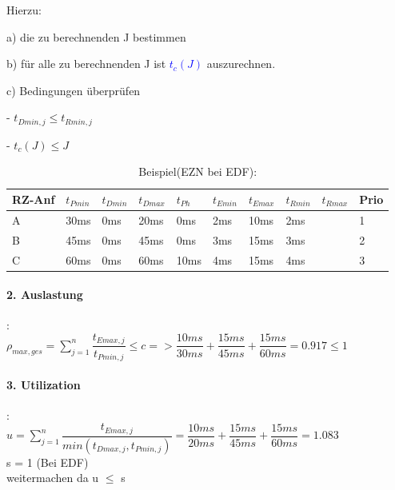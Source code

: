 \documentclass[12pt,a4paper,oneside,ngerman]{article}
\begin{document}
Hierzu: 
\begin{description}
	\item a) die zu berechnenden J bestimmen
	\item b) für alle zu berechnenden J ist \textcolor{blue}{\(t_{c}(J)\)} auszurechnen.
	\item c) Bedingungen überprüfen
	\begin{description}
		\item - \( t_{Dmin,j} \leq t_{Rmin,j} \)
		\item - \( t_{c}(J) \leq J \)
	\end{description}
\end{description}

\begin{table}[H]
	\caption{Beispiel(EZN bei EDF):}
	\begin{tabular}{|l|l|l|l|l|l|l|l|l|l|}
	\hline
	RZ-Anf & \(t_{Pmin}\) & \(t_{Dmin}\) & \(t_{Dmax}\) & \(t_{Ph}\) & \(t_{Emin}\) & \(t_{Emax}\) & \(t_{Rmin}\) & \(t_{Rmax}\) & Prio \\ \hline
	A      & 30ms         & 0ms          & 20ms         & 0ms        & 2ms          & 10ms         & 2ms          &              & 1    \\ \hline
	B      & 45ms         & 0ms          & 45ms         & 0ms        & 3ms          & 15ms         & 3ms          &              & 2    \\ \hline
	C      & 60ms         & 0ms          & 60ms         & 10ms       & 4ms          & 15ms         & 4ms          &              & 3    \\ \hline
	\end{tabular}
\end{table}

\paragraph{2. Auslastung}: \\
\(\rho_{max,ges} = \displaystyle\sum_{j=1}^n \dfrac{t_{Emax,j}}{t_{Pmin,j}} \leq c => \dfrac{10ms}{30ms} + \dfrac{15ms}{45ms} + \dfrac{15ms}{60ms} = 0.917 \leq 1\)\\

\paragraph{3. Utilization}: \\
\(u = \displaystyle\sum_{j=1}^n \dfrac{t_{Emax,j}}{ min(t_{Dmax,j}, t_{Pmin,j})}  =  \dfrac{10ms}{20ms} + \dfrac{15ms}{45ms} + \dfrac{15ms}{60ms} = 1.083 \)\\
s = 1 (Bei EDF)\\
weitermachen da u $\leq$ s\\
\end{document}
